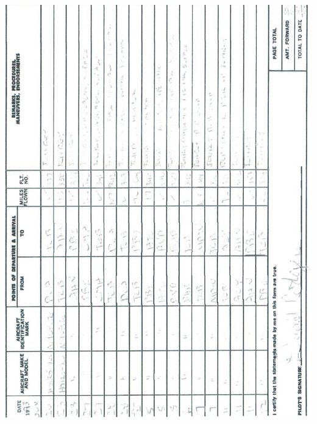 \documentclass[10pt]{article}
\begin{document}
\includegraphics[max width=\textwidth, center]{2025_02_27_dd68c3d38de88f0516d9g-024(1)}\\
\end{document}
